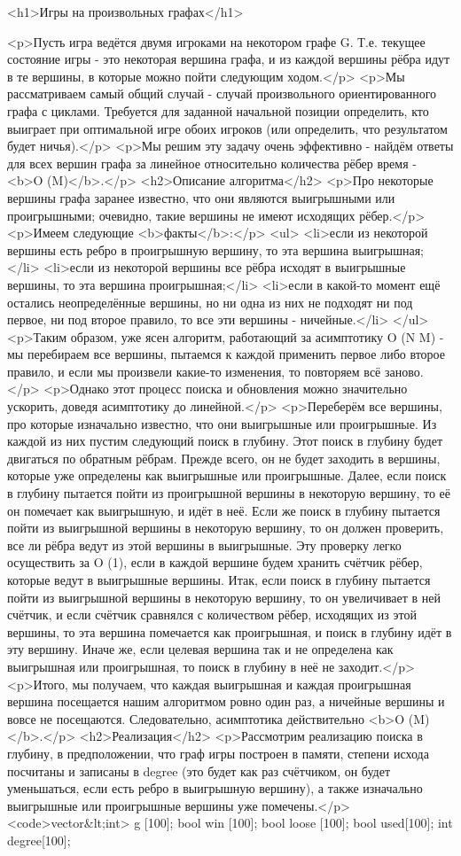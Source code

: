 <h1>Игры на произвольных графах</h1>

<p>Пусть игра ведётся двумя игроками на некотором графе G. Т.е. текущее состояние игры - это некоторая вершина графа, и из каждой вершины рёбра идут в те вершины, в которые можно пойти следующим ходом.</p>
<p>Мы рассматриваем самый общий случай - случай произвольного ориентированного графа с циклами. Требуется для заданной начальной позиции определить, кто выиграет при оптимальной игре обоих игроков (или определить, что результатом будет ничья).</p>
<p>Мы решим эту задачу очень эффективно - найдём ответы для всех вершин графа за линейное относительно количества рёбер время - <b>O (M)</b>.</p>
<h2>Описание алгоритма</h2>
<p>Про некоторые вершины графа заранее известно, что они являются выигрышными или проигрышными; очевидно, такие вершины не имеют исходящих рёбер.</p>
<p>Имеем следующие <b>факты</b>:</p>
<ul>
<li>если из некоторой вершины есть ребро в проигрышную вершину, то эта вершина выигрышная;</li>
<li>если из некоторой вершины все рёбра исходят в выигрышные вершины, то эта вершина проигрышная;</li>
<li>если в какой-то момент ещё остались неопределённые вершины, но ни одна из них не подходят ни под первое, ни под второе правило, то все эти вершины - ничейные.</li>
</ul>
<p>Таким образом, уже ясен алгоритм, работающий за асимптотику O (N M) - мы перебираем все вершины, пытаемся к каждой применить первое либо второе правило, и если мы произвели какие-то изменения, то повторяем всё заново.</p>
<p>Однако этот процесс поиска и обновления можно значительно ускорить, доведя асимптотику до линейной.</p>
<p>Переберём все вершины, про которые изначально известно, что они выигрышные или проигрышные. Из каждой из них пустим следующий поиск в глубину. Этот поиск в глубину будет двигаться по обратным рёбрам. Прежде всего, он не будет заходить в вершины, которые уже определены как выигрышные или проигрышные. Далее, если поиск в глубину пытается пойти из проигрышной вершины в некоторую вершину, то её он помечает как выигрышную, и идёт в неё. Если же поиск в глубину пытается пойти из выигрышной вершины в некоторую вершину, то он должен проверить, все ли рёбра ведут из этой вершины в выигрышные. Эту проверку легко осуществить за O (1), если в каждой вершине будем хранить счётчик рёбер, которые ведут в выигрышные вершины. Итак, если поиск в глубину пытается пойти из выигрышной вершины в некоторую вершину, то он увеличивает в ней счётчик, и если счётчик сравнялся с количеством рёбер, исходящих из этой вершины, то эта вершина помечается как проигрышная, и поиск в глубину идёт в эту вершину. Иначе же, если целевая вершина так и не определена как выигрышная или проигрышная, то поиск в глубину в неё не заходит.</p>
<p>Итого, мы получаем, что каждая выигрышная и каждая проигрышная вершина посещается нашим алгоритмом ровно один раз, а ничейные вершины и вовсе не посещаются. Следовательно, асимптотика действительно <b>O (M)</b>.</p>
<h2>Реализация</h2>
<p>Рассмотрим реализацию поиска в глубину, в предположении, что граф игры построен в памяти, степени исхода посчитаны и записаны в degree (это будет как раз счётчиком, он будет уменьшаться, если есть ребро в выигрышную вершину), а также изначально выигрышные или проигрышные вершины уже помечены.</p>
<code>vector&lt;int> g [100];
bool win [100];
bool loose [100];
bool used[100];
int degree[100];

